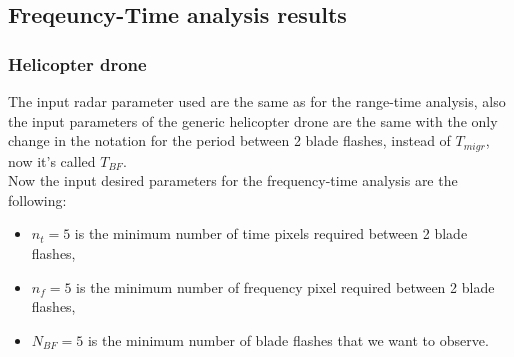 \subsection{Freqeuncy-Time analysis results}
\subsubsection{Helicopter drone}

The input radar parameter used are the same as for the range-time analysis, also the input parameters of the generic helicopter drone are the same with the only change in the notation for the period between 2 blade flashes, instead of $T_{migr}$, now it's called $T_{BF}$.\\
Now the input desired parameters for the frequency-time analysis are the following:
\begin{itemize}
    
    \item $n_{t} = 5$ is the minimum number of time pixels required between 2 blade flashes,
         
    \item $n_{f} = 5$ is the minimum number of frequency pixel required between 2 blade flashes,

    \item $N_{BF} = 5$ is the minimum number of blade flashes that we want to observe.
    
\end{itemize}

